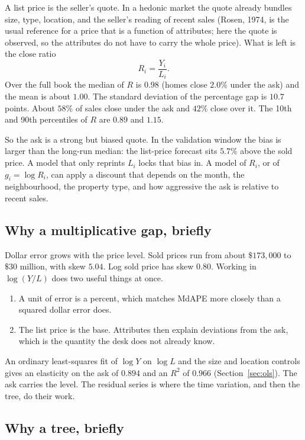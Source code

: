 \documentclass[11pt]{article}
\begin{document}
A list price is the seller's quote. In a hedonic market the quote already bundles size, type, location, and the seller's reading of recent sales (Rosen, 1974, is the usual reference for a price that is a function of attributes; here the quote is observed, so the attributes do not have to carry the whole price). What is left is the close ratio
\[
R_i = \frac{Y_i}{L_i}.
\]
Over the full book the median of \(R\) is \(0.98\) (homes close \(2.0\%\) under the ask) and the mean is about \(1.00\). The standard deviation of the percentage gap is \(10.7\) points. About \(58\%\) of sales close under the ask and \(42\%\) close over it. The 10th and 90th percentiles of \(R\) are \(0.89\) and \(1.15\).

So the ask is a strong but biased quote. In the validation window the bias is larger than the long-run median: the list-price forecast sits \(5.7\%\) above the sold price. A model that only reprints \(L_i\) locks that bias in. A model of \(R_i\), or of \(g_i = \log R_i\), can apply a discount that depends on the month, the neighbourhood, the property type, and how aggressive the ask is relative to recent sales.

\subsection{Why a multiplicative gap, briefly}

Dollar error grows with the price level. Sold prices run from about \(\$173{,}000\) to \(\$30\) million, with skew \(5.04\). Log sold price has skew \(0.80\). Working in \(\log(Y/L)\) does two useful things at once.

\begin{enumerate}
\item A unit of error is a percent, which matches MdAPE more closely than a squared dollar error does.
\item The list price is the base. Attributes then explain deviations from the ask, which is the quantity the desk does not already know.
\end{enumerate}

An ordinary least-squares fit of \(\log Y\) on \(\log L\) and the size and location controls gives an elasticity on the ask of \(0.894\) and an \(R^2\) of \(0.966\) (Section~\ref{sec:ols}). The ask carries the level. The residual series is where the time variation, and then the tree, do their work.

\subsection{Why a tree, briefly}
\end{document}
